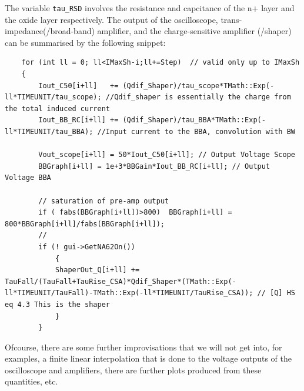 \documentclass[11pt]{article}
\begin{document}
The variable \texttt{tau\_RSD} involves the resistance and capcitance of the n+ layer and the oxide layer respectively.
\newline
The output of the oscilloscope, trans-impedance(/broad-band) amplifier, and the charge-sensitive amplifier (/shaper) can be summarised by the following snippet:
\begin{lstlisting}
    for (int ll = 0; ll<IMaxSh-i;ll+=Step)  // valid only up to IMaxSh 
    {
        Iout_C50[i+ll]   += (Qdif_Shaper)/tau_scope*TMath::Exp(-ll*TIMEUNIT/tau_scope); //Qdif_shaper is essentially the charge from the total induced current
        Iout_BB_RC[i+ll] += (Qdif_Shaper)/tau_BBA*TMath::Exp(-ll*TIMEUNIT/tau_BBA); //Input current to the BBA, convolution with BW

        Vout_scope[i+ll] = 50*Iout_C50[i+ll]; // Output Voltage Scope
        BBGraph[i+ll] = 1e+3*BBGain*Iout_BB_RC[i+ll]; // Output Voltage BBA

        // saturation of pre-amp output
        if ( fabs(BBGraph[i+ll])>800)  BBGraph[i+ll] = 800*BBGraph[i+ll]/fabs(BBGraph[i+ll]);
        //
        if (! gui->GetNA62On())		    
            {
            ShaperOut_Q[i+ll] += TauFall/(TauFall+TauRise_CSA)*Qdif_Shaper*(TMath::Exp(-ll*TIMEUNIT/TauFall)-TMath::Exp(-ll*TIMEUNIT/TauRise_CSA)); // [Q] HS eq 4.3 This is the shaper
            }
        }
\end{lstlisting}
Ofcourse, there are some further improvisations that we will not get into, for examples, a finite linear interpolation that is done to the voltage outputs of the oscilloscope and amplifiers, there are further plots produced from these quantities, etc.
\end{document}

